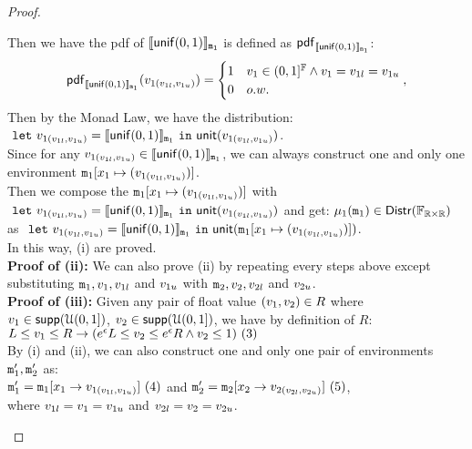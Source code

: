 \documentclass[a4paper,11pt]{article}
\begin{document}
\begin{proof}
\begin{itemize}
\begin{subproof}
	Then we have the pdf of $\llbracket \mathsf{unif}(0, 1) \rrbracket_{\mathtt{m}_1}$  
	is defined as $\mathsf{pdf}_{\llbracket \mathsf{unif}(0, 1) \rrbracket_{\mathtt{m}_1}}$:
	\[
	\mathsf{pdf}_{\llbracket \mathsf{unif}(0, 1) \rrbracket_{\mathtt{m}_1}}(v_{1(v_{1l}, v_{1u})}) = 
		\begin{cases}
		1 & v_1 \in (0,1]^{\mathbb{F}}
		\land  v_1 = v_{1l} = v_{1u}
		\\
		0       & o.w.
		\end{cases},
	\]
	Then by the Monad Law, we have the distribution:
	$~\mathtt{let}~ v_{1(v_{1l}, v_{1u})} = \llbracket \mathsf{unif}(0, 1) \rrbracket_{\mathtt{m}_1} 
	~\mathtt{in}~ \mathsf{unit}(v_{1(v_{1l}, v_{1u})})$.
	\\
	Since for any $v_{1(v_{1l}, v_{1u})} \in \llbracket \mathsf{unif}(0, 1) \rrbracket_{\mathtt{m}_1}$, 
	we can always construct one and only one environment $\mathtt{m}_1[x_1 \mapsto (v_{1(v_{1l}, v_{1u})})]$.
	\\
	Then we compose the  
	$\mathtt{m}_1[x_1 \mapsto (v_{1(v_{1l}, v_{1u})})]$
	with $~\mathtt{let}~ v_{1(v_{1l}, v_{1u})} = \llbracket \mathsf{unif}(0, 1) \rrbracket_{\mathtt{m}_1} 
	~\mathtt{in}~ \mathsf{unit}(v_{1(v_{1l}, v_{1u})})$ and get:
	$\mu_1(\mathtt{m}_1) \in \mathsf{Distr}(\mathbb{F}_{\mathbb{R} \times \mathbb{R}})$ as 
	$~\mathtt{let}~ v_{1(v_{1l}, v_{1u})} = \llbracket \mathsf{unif}(0, 1) \rrbracket_{\mathtt{m}_1} 
	~\mathtt{in}~ \mathsf{unit}(\mathtt{m}_1[x_1 \mapsto (v_{1(v_{1l}, v_{1u})})])$.
	\\
	In this way, (i) are proved.
	\\
	\textbf{Proof of (ii):} 
	We can also prove (ii) by repeating every steps above except substituting $\mathtt{m}_1, v_1, v_{1l}$ and $v_{1u}$ with $\mathtt{m}_2, v_2, v_{2l}$ and $v_{2u}$.
	\\
	\textbf{Proof of (iii):} 
	Given any pair of float value $(v_1, v_2) \in R$ where 
	$v_1 \in \mathsf{supp}(\mathcal{U}(0,1])$, 
	$v_2 \in \mathsf{supp}(\mathcal{U}(0,1])$, we have by definition of $R$:
	\\
	$L \leq v_1 \leq R \rightarrow
	(e^{\epsilon} L \leq v_2 \leq 	e^{\epsilon} R
	\land v_2 \leq 1)
	 ~ (3)$
	\\
	By (i) and (ii), we can also construct one and only one pair of environments $\mathtt{m}_1', \mathtt{m}_2'$ as:
	\\
	$\mathtt{m}_1' = \mathtt{m}_1[x_1 \to v_{1(v_{1l}, v_{1u})}] ~ (4)$ and
	$\mathtt{m}_2' = \mathtt{m}_2[x_2 \to v_{2(v_{2l}, v_{2u})}] ~ (5)$,
	\\
	where $v_{1l} = v_1 = v_{1u}$ and $v_{2l} = v_2 = v_{2u}$.

\end{subproof}
\end{itemize}
\end{proof}
\end{document}
